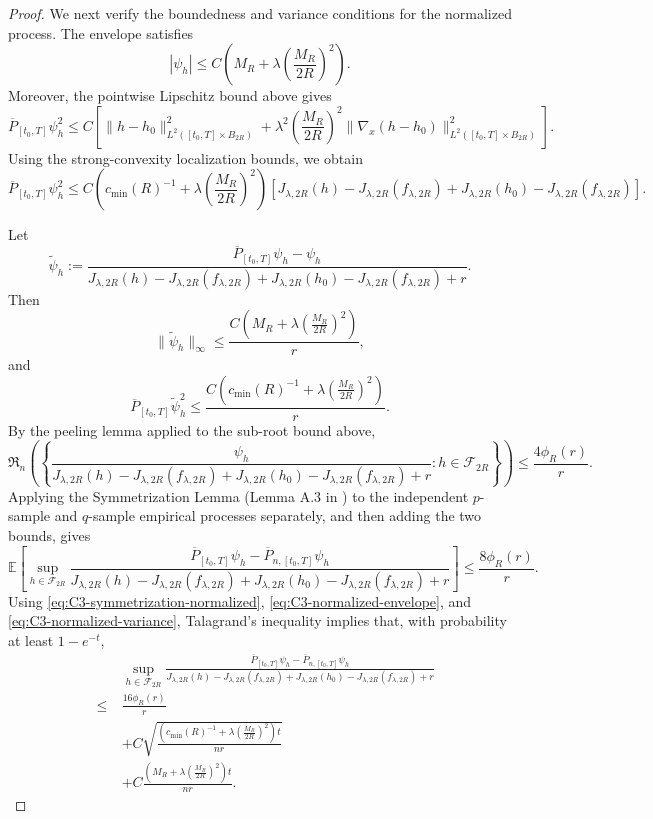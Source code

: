 \documentclass[11pt]{article}
\theoremstyle{plain}
\theoremstyle{definition}
\theoremstyle{remark}
\begin{document}
\begin{proof}
We next verify the boundedness and variance conditions for the normalized
process. The envelope satisfies
\[
|\psi_h|
\le
C\left(
M_R+
\lambda\left(\frac{M_R}{2R}\right)^2
\right).
\]
Moreover, the pointwise Lipschitz bound above gives
\[
\overline P_{[t_0,T]}\psi_h^2
\le
C\left[
\|h-h_0\|_{L^2([t_0,T]\times B_{2R})}^2
+
\lambda^2\left(\frac{M_R}{2R}\right)^2
\|\nabla_x(h-h_0)\|_{L^2([t_0,T]\times B_{2R})}^2
\right].
\]
Using the strong-convexity localization bounds, we obtain
\[
\overline P_{[t_0,T]}\psi_h^2
\le
C\left(
c_{\min}(R)^{-1}
+
\lambda\left(\frac{M_R}{2R}\right)^2
\right)
\left[
J_{\lambda,2R}(h)-J_{\lambda,2R}(f_{\lambda,2R})
+
J_{\lambda,2R}(h_0)-J_{\lambda,2R}(f_{\lambda,2R})
\right].
\]

Let
\[
\widetilde\psi_h:=
\frac{\overline P_{[t_0,T]}\psi_h-\psi_h}
{
J_{\lambda,2R}(h)-J_{\lambda,2R}(f_{\lambda,2R})
+
J_{\lambda,2R}(h_0)-J_{\lambda,2R}(f_{\lambda,2R})
+r
}.
\]
Then
\begin{equation}
\label{eq:C3-normalized-envelope}
\|\widetilde\psi_h\|_\infty
\le
\frac{
C\left(
M_R+\lambda\left(\frac{M_R}{2R}\right)^2
\right)
}{r},
\end{equation}
and
\begin{equation}
\label{eq:C3-normalized-variance}
\overline P_{[t_0,T]}\widetilde\psi_h^2
\le
\frac{
C\left(
c_{\min}(R)^{-1}
+
\lambda\left(\frac{M_R}{2R}\right)^2
\right)
}{r}.
\end{equation}
By the peeling lemma applied to the sub-root bound above,
\[
\mathfrak R_n\left(
\left\{
\frac{\psi_h}{
J_{\lambda,2R}(h)-J_{\lambda,2R}(f_{\lambda,2R})
+
J_{\lambda,2R}(h_0)-J_{\lambda,2R}(f_{\lambda,2R})
+r
}:h\in\mathcal F_{2R}
\right\}
\right)
\le
\frac{4\phi_R(r)}{r}.
\]
Applying the Symmetrization Lemma (Lemma A.3 in
\cite{lu2021machine}) to the independent \(p\)-sample and \(q\)-sample empirical
processes separately, and then adding the two bounds, gives
\begin{equation}
\label{eq:C3-symmetrization-normalized}
\mathbb E \left[\sup_{h\in\mathcal F_{2R}}
\frac{\overline P_{[t_0,T]}\psi_h-\overline P_{n,[t_0,T]}\psi_h}
{
J_{\lambda,2R}(h)-J_{\lambda,2R}(f_{\lambda,2R})
+
J_{\lambda,2R}(h_0)-J_{\lambda,2R}(f_{\lambda,2R})
+r
}\right]
\le
\frac{8\phi_R(r)}{r}.
\end{equation}
Using \eqref{eq:C3-symmetrization-normalized},
\eqref{eq:C3-normalized-envelope}, and \eqref{eq:C3-normalized-variance},
Talagrand's inequality implies that, with
probability at least \(1-e^{-t}\),
\begin{eqnarray*}
&&\sup_{h\in\mathcal F_{2R}}
\frac{\overline P_{[t_0,T]}\psi_h-\overline P_{n,[t_0,T]}\psi_h}
{
J_{\lambda,2R}(h)-J_{\lambda,2R}(f_{\lambda,2R})
+
J_{\lambda,2R}(h_0)-J_{\lambda,2R}(f_{\lambda,2R})
+r
}\\
&\le&
\frac{16\phi_R(r)}{r}\\
&\quad&+
C\sqrt{
\frac{
\left(
c_{\min}(R)^{-1}
+
\lambda\left(\frac{M_R}{2R}\right)^2
\right)t
}{nr}
}\\
&\quad&+
C\frac{
\left(
M_R+\lambda\left(\frac{M_R}{2R}\right)^2
\right)t
}{nr}.
\end{eqnarray*}



\end{proof}
\end{document}
